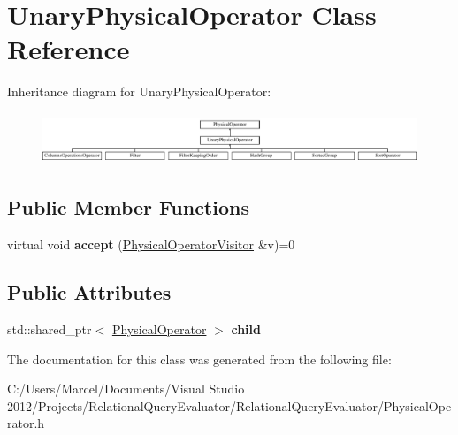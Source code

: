 \hypertarget{class_unary_physical_operator}{\section{Unary\+Physical\+Operator Class Reference}
\label{class_unary_physical_operator}
}
Inheritance diagram for Unary\+Physical\+Operator\+:\begin{figure}[H]
\begin{center}
\leavevmode
\includegraphics[height=1.546961cm]{class_unary_physical_operator}
\end{center}
\end{figure}
\subsection*{Public Member Functions}
\begin{DoxyCompactItemize}
\item 
\hypertarget{class_unary_physical_operator_a3b0160d380149213561ef2ba479dbf6a}{virtual void {\bfseries accept} (\hyperlink{class_physical_operator_visitor}{Physical\+Operator\+Visitor} \&v)=0}\label{class_unary_physical_operator_a3b0160d380149213561ef2ba479dbf6a}

\end{DoxyCompactItemize}
\subsection*{Public Attributes}
\begin{DoxyCompactItemize}
\item 
\hypertarget{class_unary_physical_operator_acb7166fc6eabb3c8fd32e7a4d0b76425}{std\+::shared\+\_\+ptr$<$ \hyperlink{class_physical_operator}{Physical\+Operator} $>$ {\bfseries child}}\label{class_unary_physical_operator_acb7166fc6eabb3c8fd32e7a4d0b76425}

\end{DoxyCompactItemize}


The documentation for this class was generated from the following file\+:\begin{DoxyCompactItemize}
\item 
C\+:/\+Users/\+Marcel/\+Documents/\+Visual Studio 2012/\+Projects/\+Relational\+Query\+Evaluator/\+Relational\+Query\+Evaluator/Physical\+Operator.\+h\end{DoxyCompactItemize}
